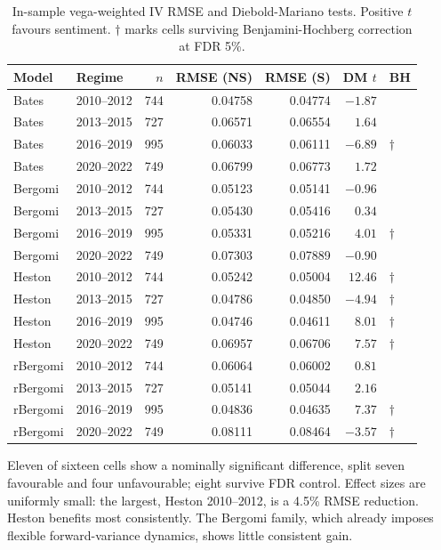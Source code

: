 \documentclass[11pt,a4paper]{article}
\begin{document}
\begin{table}[h]
\centering
\caption{In-sample vega-weighted IV RMSE and Diebold-Mariano tests. Positive $t$
favours sentiment. $\dagger$ marks cells surviving Benjamini-Hochberg correction
at FDR 5\%.}
\label{tab:insample}
\begin{tabular}{llrrrrl}
\toprule
Model & Regime & $n$ & RMSE (NS) & RMSE (S) & DM $t$ & BH \\
\midrule
Bates    & 2010--2012 & 744 & 0.04758 & 0.04774 & $-1.87$  & \\
Bates    & 2013--2015 & 727 & 0.06571 & 0.06554 & $1.64$   & \\
Bates    & 2016--2019 & 995 & 0.06033 & 0.06111 & $-6.89$  & $\dagger$ \\
Bates    & 2020--2022 & 749 & 0.06799 & 0.06773 & $1.72$   & \\
Bergomi  & 2010--2012 & 744 & 0.05123 & 0.05141 & $-0.96$  & \\
Bergomi  & 2013--2015 & 727 & 0.05430 & 0.05416 & $0.34$   & \\
Bergomi  & 2016--2019 & 995 & 0.05331 & 0.05216 & $4.01$   & $\dagger$ \\
Bergomi  & 2020--2022 & 749 & 0.07303 & 0.07889 & $-0.90$  & \\
Heston   & 2010--2012 & 744 & 0.05242 & 0.05004 & $12.46$  & $\dagger$ \\
Heston   & 2013--2015 & 727 & 0.04786 & 0.04850 & $-4.94$  & $\dagger$ \\
Heston   & 2016--2019 & 995 & 0.04746 & 0.04611 & $8.01$   & $\dagger$ \\
Heston   & 2020--2022 & 749 & 0.06957 & 0.06706 & $7.57$   & $\dagger$ \\
rBergomi & 2010--2012 & 744 & 0.06064 & 0.06002 & $0.81$   & \\
rBergomi & 2013--2015 & 727 & 0.05141 & 0.05044 & $2.16$   & \\
rBergomi & 2016--2019 & 995 & 0.04836 & 0.04635 & $7.37$   & $\dagger$ \\
rBergomi & 2020--2022 & 749 & 0.08111 & 0.08464 & $-3.57$  & $\dagger$ \\
\bottomrule
\end{tabular}
\end{table}

Eleven of sixteen cells show a nominally significant difference, split seven
favourable and four unfavourable; eight survive FDR control. Effect sizes are
uniformly small: the largest, Heston 2010--2012, is a 4.5\% RMSE reduction.
Heston benefits most consistently. The Bergomi family, which already imposes
flexible forward-variance dynamics, shows little consistent gain.
\end{document}

